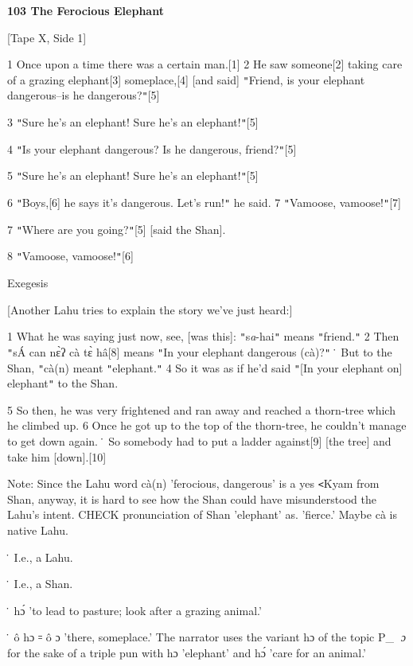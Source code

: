 
\textbf{103 The Ferocious Elephant }

[Tape X, Side 1]

1 Once upon a time there was a certain man.[1] 2 He saw someone[2] taking care
of a grazing elephant[3] someplace,[4] [and said] \texttt{"}Friend, is your elephant
dangerous--is he dangerous?\texttt{"}[5]

3 \texttt{"}Sure he's an elephant! Sure he's an elephant!\texttt{"}[5]

4 \texttt{"}Is your elephant dangerous? Is he dangerous, friend?\texttt{"}[5]

5 \texttt{"}Sure he's an elephant! Sure he's an elephant!\texttt{"}[5]

6 \texttt{"}Boys,[6] he says it's dangerous. Let's run!\texttt{"} he said. 7 \texttt{"}Vamoose,
vamoose!\texttt{"}[7]

7 \texttt{"}Where are you going?\texttt{"}[5] [said the Shan].

8 \texttt{"}Vamoose, vamoose!\texttt{"}[6]

\begin{center}
Exegesis
\end{center}

\leftskip=0pt
[Another Lahu tries to explain the story we've just heard:]

1 What he was saying just now, see, [was this]: \texttt{"}s\textit{a}-hai\texttt{"}
means \texttt{"}friend.\texttt{"} 2 Then \texttt{"}sÁ can nɛ̀ʔ cà tɛ̀ hâ[8]
means \texttt{"}In your elephant dangerous (cà)?\texttt{"} \. But to the Shan,
\texttt{"}cà(n) meant \texttt{"}elephant.\texttt{"} 4 So it was as if he'd said
\texttt{"}[In your elephant on] elephant\texttt{"} to the Shan.

5 So then, he was very frightened and ran away and reached a thorn-tree which he
climbed up. 6 Once he got up to the top of the thorn-tree, he couldn't manage to
get down again. \. So somebody had to put a ladder against[9] [the tree] and take
him [down].[10]

Note: Since the Lahu word cà(n) 'ferocious, dangerous' is a yes \texttt{<}Kyam
from Shan, anyway, it is hard to see how the Shan could have misunderstood the
Lahu's intent. CHECK pronunciation of Shan 'elephant' as. 'fierce.' Maybe cà is
native Lahu.

\. I.e., a Lahu.

\. I.e., a Shan.

\. hɔ́ 'to lead to pasture; look after a grazing animal.'

\. ô hɔ ꞊ ô ɔ 'there, someplace.' The narrator uses the variant hɔ of the
topic P_{} \emph{ɔ} for the sake of a triple pun with hɔ 'elephant' and hɔ́
'care for an animal.'

